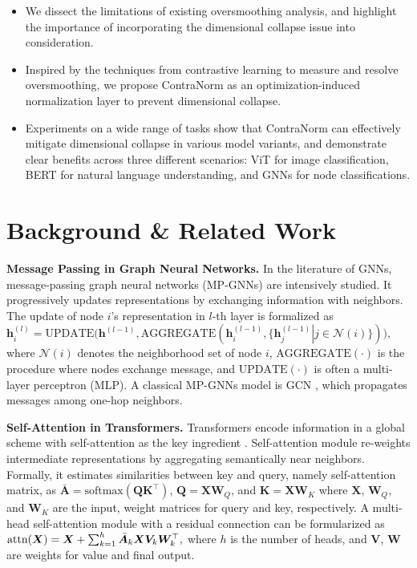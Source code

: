 \documentclass{article}
\def\vh{{\bm{h}}}
\def\mA{{\bm{A}}}
\def\mK{{\bm{K}}}
\def\mQ{{\bm{Q}}}
\def\mV{{\bm{V}}}
\def\mW{{\bm{W}}}
\def\mX{{\bm{X}}}
\def\gN{{\mathcal{N}}}
\theoremstyle{definition}
\theoremstyle{remark}
\theoremstyle{theorem}
\begin{document}
\begin{itemize}
    \item We dissect the limitations of existing oversmoothing analysis, and highlight the importance of incorporating the dimensional collapse issue into consideration.
    \item Inspired by the techniques from contrastive learning to measure and resolve oversmoothing, we propose ContraNorm as an optimization-induced normalization layer to prevent dimensional collapse.
    \item Experiments on a wide range of tasks show that ContraNorm can effectively mitigate dimensional collapse in various model variants, and demonstrate clear benefits across three different scenarios: ViT for image classification, BERT for natural language understanding, and GNNs for node classifications. 
\end{itemize}




\section{Background \& Related Work}

\textbf{Message Passing in Graph Neural Networks.} In the literature of GNNs, message-passing graph neural networks (MP-GNNs) are intensively studied. It progressively updates representations by exchanging information with neighbors. The update of node $i$'s representation in $l$-th layer is formalized as
$
    \vh^{(l)}_i = \mbox{UPDATE}\big(\vh^{(l-1)}, \mbox{AGGREGATE}(\vh^{(l-1)}_i, \{\vh^{(l-1)}_j \left\vert \right.j \in \gN(i)\})\big),
$
where $\gN(i)$ denotes the neighborhood set of node $i$, $\mbox{AGGREGATE}(\cdot)$ is the procedure where nodes exchange message, and $\mbox{UPDATE}(\cdot)$ is often a multi-layer perceptron (MLP). A classical MP-GNNs model is GCN \citep{kipf2016semi}, which propagates messages among one-hop neighbors.

\textbf{Self-Attention in Transformers.} Transformers encode information in a global scheme with self-attention as the key ingredient \citep{vaswani2017attention}. Self-attention module re-weights intermediate representations by aggregating semantically near neighbors. Formally, it estimates similarities between key and query, namely self-attention matrix, as $\bar{\mA} = \mbox{softmax}(\mQ\mK^{\top})$, $\mQ=\mX\mW_Q$, and $\mK=\mX\mW_K$ where $\mX$, $\mW_Q$, and $\mW_K$ are the input, weight matrices for query and key, respectively. A multi-head self-attention module with a residual connection can be formularized as $\mbox{\rm{attn}}(\mX) = \mX + \sum_{k=1}^h \bar{\mA}_k\mX\mV_k\mW_k^{\top},$
where $h$ is the number of heads, and $\mV$, $\mW$ are weights for value and final output.
\end{document}
